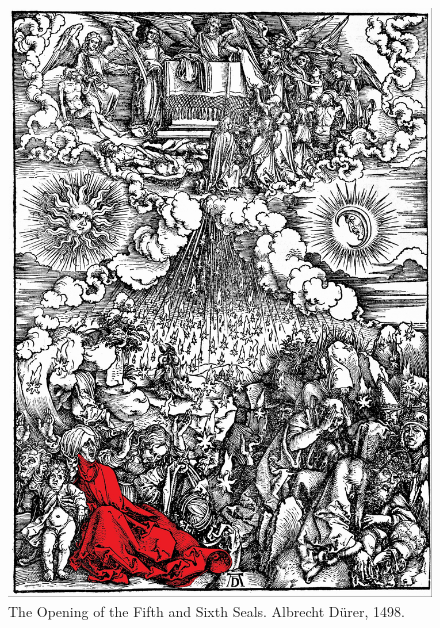   \begin{figure}[p]
  	\centering
  	\includegraphics[scale=0.2]{Durer/Durer_Sixth_Seal.jpg}
  	\caption[The Opening of the Fifth and Sixth Seals]{The Opening of the Fifth and Sixth Seals. Albrecht Dürer, 1498.}
  \end{figure}
